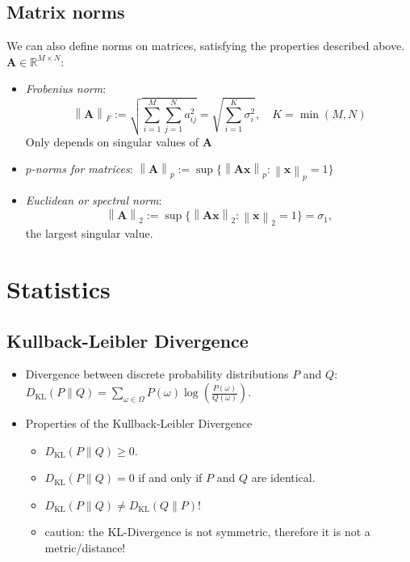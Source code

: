 \documentclass[conference,11pt]{IEEEtran}
\newcommand{\norm}[1]{\left\lVert#1\right\rVert}
\newcommand{\matr}[1]{\boldsymbol{\mathbf{#1}}}
\newcommand{\vect}[1]{\boldsymbol{\mathbf{#1}}}
\newcommand{\R}{\mathbb{R}}
\begin{document}
\subsection{Matrix norms}
We can also define norms on matrices, satisfying the properties described
above. $\matr{A} \in \R^{M \times N}$:
\begin{itemize}
  \item \emph{Frobenius norm}:
    \[
      \norm{\matr{A}}_F := \sqrt{\sum_{i=1}^M\sum_{j=1}^N a_{ij}^2}
      = \sqrt{\sum_{i=1}^{K} \sigma_i^2}, \quad K = \min(M,N)
    \]
    Only depends on singular values of $\matr{A}$

  \item \emph{$p$-norms for matrices}:
    \(
      \norm{\matr{A}}_p := \sup\{\norm{\matr{A}\vect{x}}_p :
      \norm{\vect{x}}_p = 1\}
    \)
  \item \emph{Euclidean or spectral norm}:
    \[
      \norm{\matr{A}}_2 := \sup\{\norm{\matr{A}\vect{x}}_2 :
      \norm{\vect{x}}_2 = 1\} = \sigma_1,
    \]
    the largest singular value.

\end{itemize}

\section{Statistics}
\subsection{Kullback-Leibler Divergence}
\begin{itemize}
  \item Divergence between discrete probability distributions $P$ and $Q$:
    \(
      D_{\mathrm{KL}}(P \| Q) = \sum_{\omega \in \Omega} P(\omega)
      \log\left(\frac{P(\omega)}{Q(\omega)}\right).
    \)
  \item Properties of the Kullback-Leibler Divergence
    \begin{itemize}
      \item $D_{\mathrm{KL}}(P \| Q) \geq 0$.
      \item $D_{\mathrm{KL}}(P \| Q) = 0$ if and only if $P$ and $Q$ are
        identical.
      \item $D_{\mathrm{KL}}(P \| Q) \neq D_{\mathrm{KL}}(Q \| P)$!
      \item caution: the KL-Divergence is not symmetric, therefore it is not a
        metric/distance!
    \end{itemize}
\end{itemize}
\end{document}
